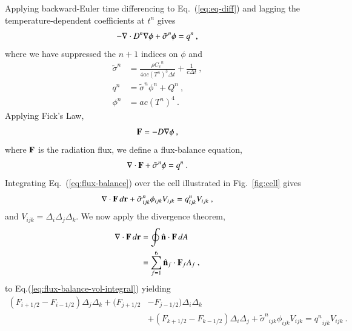 \documentclass[preprint,12pt]{elsarticle}
\newcommand{\Cv}{\ensuremath{C_{v}}}
\newcommand{\dt}{\ensuremath{\Delta t}}
\newcommand{\sign}{\ensuremath{\tilde{\sigma}^n}}
\newcommand{\qn}{\ensuremath{q^n}}
\newcommand{\Tn}{\ensuremath{T^n}}
\newcommand{\Dn}{\ensuremath{D^n}}
\newcommand{\phin}{\ensuremath{\phi^n}}
\newcommand{\Di}{\ensuremath{\Delta_i}}
\newcommand{\Dj}{\ensuremath{\Delta_j}}
\newcommand{\Dk}{\ensuremath{\Delta_k}}
\begin{document}
Applying backward-Euler time differencing to Eq.~(\ref{eq:eq-diff})
and lagging the temperature-dependent coefficients at $t^n$ gives
\begin{equation}
  -\nabla\cdot \Dn\grad{\phi} + \sign\phi = \qn\:,
\end{equation}
where we have suppressed the $n+1$ indices on $\phi$ and 
\begin{align}
  \sign &= \frac{\rho \Cv^n}{4ac(\Tn)^3\dt} + \frac{1}{c\dt}\:,\\
  \qn &= \sign\phin + Q^n\:,\\
  \phin &= ac(\Tn)^4\:.
\end{align}
Applying Fick's Law,
\begin{equation}
  \mathbf{F} = -D\nabla \phi\:,
  \label{eq:fick}
\end{equation}
where $\mathbf{F}$ is the radiation flux, we define a flux-balance
equation,
\begin{equation}
  \dive{F} + \sign\phi = \qn\:.
  \label{eq:flux-balance}
\end{equation}
Integrating Eq.~(\ref{eq:flux-balance}) over the cell illustrated in
Fig.~\ref{fig:cell} gives
\begin{equation}
  \iiint\dive{F}\,d\ve{r} +
  \sign_{ijk}\phi_{ijk}V_{ijk}=\qn_{ijk}V_{ijk}\:,
  \label{eq:flux-balance-vol-integral}
\end{equation}
and $V_{ijk} = \Delta_i\Delta_j\Delta_k$.  We now apply the divergence
theorem,
\begin{equation}
  \begin{split}
    \relax\nabla\cdot\mathbf{F}\,d\mathbf{r} &= \oint\hat{\mathbf{n}}\cdot\mathbf{F}\,dA\\
    &= \sum_{f=1}^{6}\hat{\mathbf{n}}_f\cdot\mathbf{F}_f A_f\:,
  \end{split}
\end{equation}
to Eq.(\ref{eq:flux-balance-vol-integral}) yielding
\begin{equation}
  \begin{split}
    (F_{i+1/2} - F_{i-1/2})\Dj\Dk + (F_{j+1/2} &- F_{j-1/2})\Di\Dk \\
    &+ (F_{k+1/2} - F_{k-1/2})\Di\Dj
    + \sign_{ijk}\phi_{ijk}V_{ijk} = \qn_{ijk}V_{ijk}\:.
  \end{split}
  \label{eq:flux-balance-difference}
\end{equation}
\end{document}
